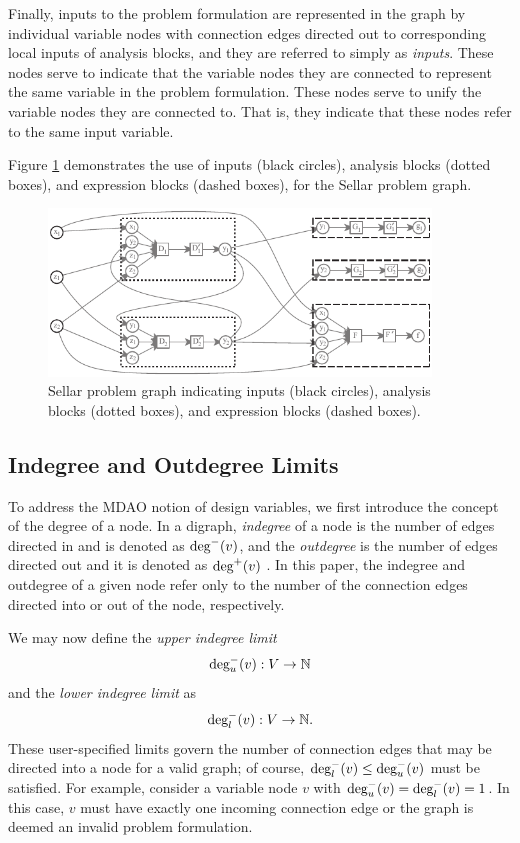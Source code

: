   Finally, inputs to the problem formulation are represented in the graph by individual variable nodes with connection edges directed out to corresponding local inputs of analysis blocks, and they are referred to simply as \emph{inputs}. 
  These nodes serve to indicate that the variable nodes they are connected to represent the same variable in the problem formulation.
  These nodes serve to unify the variable nodes they are connected to. That is, they indicate that these nodes refer to the same input variable.

  Figure \ref{f:obj-cons} demonstrates the use of inputs (black circles), analysis blocks (dotted boxes), and expression blocks (dashed boxes), for the Sellar problem graph.
  \begin{figure}[htb!]
    \begin{center}
      \includegraphics[width=4.0in]{images/sellar_obj_and_cons}
    \end{center}
    \caption{Sellar problem graph indicating inputs (black circles), analysis blocks (dotted boxes), and expression blocks (dashed boxes).}
  \label{f:obj-cons}
  \end{figure} 

\subsection{Indegree and Outdegree Limits}
  \label{s:indegree-outdegree}
	To address the MDAO notion of design variables, we first introduce the concept of the degree of a node.
  In a digraph, \emph{indegree} of a node is the number of edges directed in and 
  is denoted as $\textrm{deg}^-(v)$, and the \emph{outdegree} 
  is the number of edges directed out and it is denoted as $\textrm{deg}^+(v)$ \cite{Diestel2010}.
  In this paper, the indegree and outdegree of a given node refer only to the number of the connection edges 
  directed into or out of the node, respectively. 

  We may now define the \emph{upper indegree limit} 
  \begin{equation}
  \textrm{deg}_u^-(v):V \to \mathbb{N}
  \end{equation} 
  and the \emph{lower indegree limit} as
  \begin{equation}
  \textrm{deg}_l^-(v):V \to \mathbb{N}.
  \end{equation}
  These user-specified limits govern the number of connection edges that may 
  be directed into a node for a valid graph; of course, $\textrm{deg}_l^-(v) \leq \textrm{deg}_u^-(v)$ must be satisfied. 
  For example, consider a variable node $v$ with $\textrm{deg}_u^-(v) = \textrm{deg}_l^-(v) = 1$. In this case, $v$ 
  must have exactly one incoming connection edge or the graph is deemed an invalid problem formulation. 

